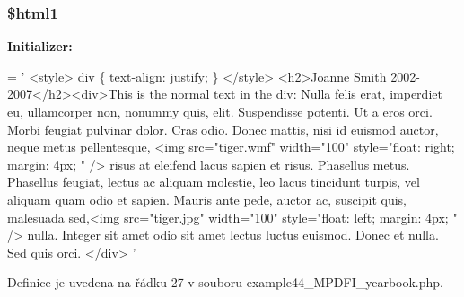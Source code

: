 \hypertarget{example44___m_p_d_f_i__yearbook_8php_a9df17bdad503cfc6595c6b74b38a9f99}{
\subsubsection[{\$html1}]{\setlength{\rightskip}{0pt plus 5cm}\$html1}}\label{example44___m_p_d_f_i__yearbook_8php_a9df17bdad503cfc6595c6b74b38a9f99}
{\bfseries Initializer\-:}
\begin{DoxyCode}
= \textcolor{stringliteral}{'}
\textcolor{stringliteral}{<style>}
\textcolor{stringliteral}{div \{ text-align: justify; \}}
\textcolor{stringliteral}{</style>}
\textcolor{stringliteral}{<h2>Joanne Smith 2002-2007</h2><div>This is the normal text in the div: Nulla felis erat, imperdiet eu,
       ullamcorper non, nonummy quis, elit. Suspendisse potenti. Ut a eros orci. Morbi feugiat pulvinar dolor. Cras
       odio. Donec mattis, nisi id euismod auctor, neque metus pellentesque, <img src="tiger.wmf" width="100"
       style="float: right; margin: 4px; " /> risus at eleifend lacus sapien et risus. Phasellus metus. Phasellus feugiat,
       lectus ac aliquam molestie, leo lacus tincidunt turpis, vel aliquam quam odio et sapien. Mauris ante pede,
       auctor ac, suscipit quis, malesuada sed,<img src="tiger.jpg" width="100" style="float: left; margin: 4px; "
       /> nulla. Integer sit amet odio sit amet lectus luctus euismod. Donec et nulla. Sed quis orci. </div>}
\textcolor{stringliteral}{'}
\end{DoxyCode}


Definice je uvedena na řádku 27 v souboru example44\-\_\-\-M\-P\-D\-F\-I\-\_\-yearbook.\-php.

